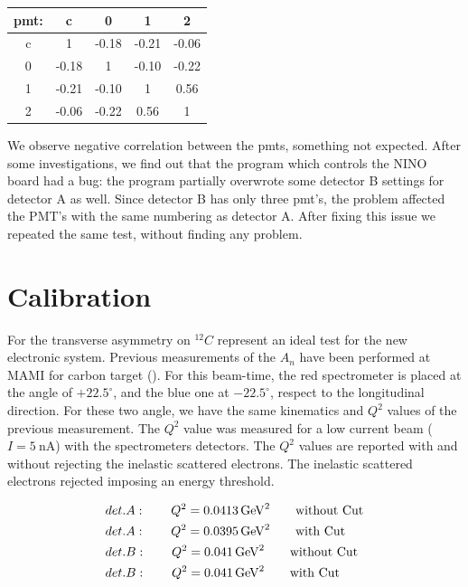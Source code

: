 \begin{center}
\begin{tabular}{c|c|c|c|c}
\hline 
pmt: & c & 0 & 1 & 2 \\ 
\hline 
c 	 & 1 & -0.18  & -0.21  & -0.06  \\ 
\hline 
0 	 & -0.18  & 1 & -0.10  & -0.22  \\ 
\hline 
1    & -0.21  & -0.10  & 1 & 0.56  \\ 
\hline 
2    & -0.06 & -0.22  & 0.56  & 1 \\ 
\hline 
\end{tabular} 
\end{center}


We observe negative correlation between the pmts, something not expected. After some investigations, we find out that the program which controls the NINO board had a bug: the program partially overwrote some detector B settings for detector A as well. Since detector B has only three pmt's, the problem affected the PMT's with the same numbering as detector A. After fixing this issue we repeated the same test, without finding any problem. 

\section{Calibration}

For the transverse asymmetry on $^{12}C$ represent an ideal test for the new electronic system. Previous measurements of the $A_{n}$ have been performed at MAMI for carbon target (\cite{Esser:2018vdp}). For this beam-time, the red spectrometer is placed at the angle of $+22.5^{\circ}$, and the blue one at $-22.5^{\circ}$, respect to the longitudinal direction.
For these two angle, we have the same kinematics and $Q^{2}$ values of the previous measurement. The $Q^{2}$ value was measured for a low current beam ($I = \SI{5}{\nano \ampere}$) with the spectrometers detectors. The $Q^{2}$ values are reported with and without rejecting the inelastic scattered electrons. The inelastic scattered electrons rejected imposing an energy threshold. 

\begin{flushleft}
\begin{align*}
& det. A : \qquad Q^{2} = \SI{0.0413}{\giga \electronvolt \squared} \qquad \textnormal{without Cut} \\
& det. A : \qquad Q^{2} = \SI{0.0395}{\giga \electronvolt \squared} \qquad \textnormal{with Cut} \\
& det. B : \qquad Q^{2} = \SI{0.041}{\giga \electronvolt \squared} \qquad \textnormal{without Cut} \\
& det. B : \qquad Q^{2} = \SI{0.041}{\giga \electronvolt \squared} \qquad \textnormal{with Cut} 
\end{align*} 
\end{flushleft}

